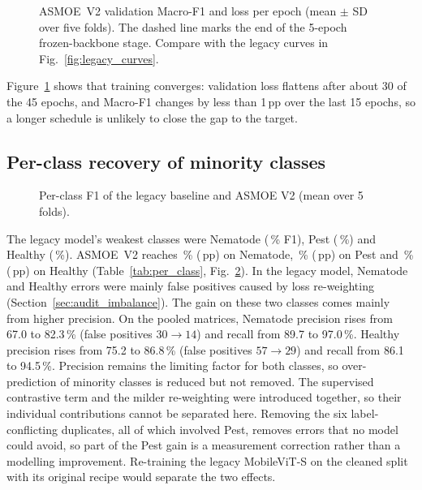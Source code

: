 \begin{figure}[h]
  \centering
  \caption{ASMOE~V2 validation Macro-F1 and loss per epoch (mean $\pm$ SD over
  five folds). The dashed line marks the end of the 5-epoch frozen-backbone
  stage. Compare with the legacy curves in Fig.~\ref{fig:legacy_curves}.}
  \label{fig:v2_curves}
\end{figure}

Figure~\ref{fig:v2_curves} shows that training converges: validation loss
flattens after about 30 of the 45 epochs, and Macro-F1 changes by less than
1\,pp over the last 15 epochs, so a longer schedule is unlikely to close the
gap to the target.

\subsection{Per-class recovery of minority classes}
\label{sec:results_perclass}



\begin{figure}[h]
  \centering
  \caption{Per-class F1 of the legacy baseline and ASMOE V2 (mean over 5 folds).}
  \label{fig:per_class}
\end{figure}

The legacy model's weakest classes were Nematode (\BaseFOneNematode\,\% F1),
Pest (\BaseFOnePest\,\%) and Healthy (\BaseFOneHealthy\,\%). ASMOE~V2 reaches
\VtwoFOneNematode\,\% (\DeltaFOneNematode\,pp) on Nematode,
\VtwoFOnePest\,\% (\DeltaFOnePest\,pp) on Pest and
\VtwoFOneHealthy\,\% (\DeltaFOneHealthy\,pp) on Healthy
(Table~\ref{tab:per_class}, Fig.~\ref{fig:per_class}).
In the legacy model, Nematode and Healthy errors were mainly false positives
caused by loss re-weighting (Section~\ref{sec:audit_imbalance}). The gain on
these two classes comes mainly from higher precision. On the pooled matrices,
Nematode precision rises from 67.0 to 82.3\,\% (false positives $30\rightarrow14$)
and recall from 89.7 to 97.0\,\%. Healthy precision rises from 75.2 to 86.8\,\%
(false positives $57\rightarrow29$) and recall from 86.1 to 94.5\,\%. Precision
remains the limiting factor for both classes, so over-prediction of minority
classes is reduced but not removed. The supervised contrastive term and the
milder re-weighting were introduced together, so their individual contributions
cannot be separated here. Removing the six label-conflicting duplicates, all of which
involved Pest, removes errors that no model could avoid, so part of the Pest
gain is a measurement correction rather than a modelling improvement.
Re-training the legacy MobileViT-S on the cleaned split with its original recipe
would separate the two effects.

